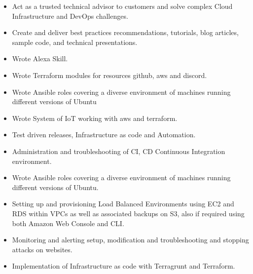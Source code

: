 \divider

\begin{itemize}
    \item Act as a trusted technical advisor to customers and solve complex Cloud Infrastructure and DevOps challenges.
    \item Create and deliver best practices recommendations, tutorials, blog articles, sample code, and technical presentations.
    \item Wrote Alexa Skill.
    \item Wrote Terraform modules for resources github, aws and discord.
    \item Wrote Ansible roles covering a diverse environment of machines running different versions of Ubuntu
    \item Wrote System of IoT working with aws and terraform.
    \item Test driven releases, Infrastructure as code and Automation.
    \item Administration and troubleshooting of CI, CD Continuous Integration environment.
\end{itemize}

\divider

\begin{itemize}
    \item Wrote Ansible roles covering a diverse environment of machines running different versions of Ubuntu.
    \item Setting up and provisioning Load Balanced Environments using EC2 and RDS within VPCs as well as associated backups on S3, also if required using both Amazon Web Console and CLI.
    \item Monitoring and alerting setup, modification and troubleshooting and stopping attacks on websites.
    \item Implementation of Infrastructure as code with Terragrunt and Terraform.
\end{itemize}

\divider


